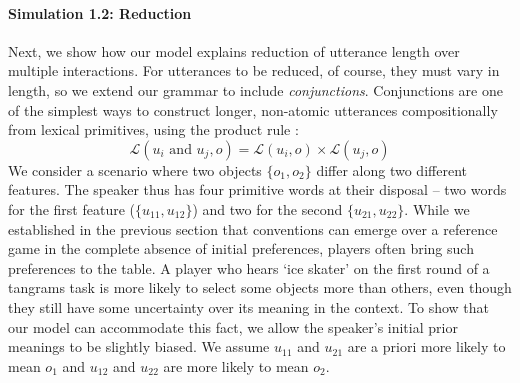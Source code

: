 \paragraph{Simulation 1.2: Reduction}

Next, we show how our model explains reduction of utterance length over multiple interactions. 
For utterances to be reduced, of course, they must vary in length, so we extend our grammar to include \emph{conjunctions}. 
Conjunctions are one of the simplest ways to construct longer, non-atomic utterances compositionally from lexical primitives, using the product rule \cite<see also>[who instead consider negation]{SteinertThrelkeld16_CompositionalSignaling}:
$$\mathcal{L}(u_i \textrm{ and } u_j, o) = \mathcal{L}(u_i, o) \times \mathcal{L}(u_j, o)$$
We consider a scenario where two objects $\{o_1, o_2\}$ differ along two different features. 
The speaker thus has four primitive words at their disposal -- two words for the first feature ($\{u_{11}, u_{12}\}$) and two for the second $\{u_{21}, u_{22}\}$. 
While we established in the previous section that conventions can emerge over a reference game in the complete absence of initial preferences, players often bring such preferences to the table. 
A player who hears `ice skater' on the first round of a tangrams task is more likely to select some objects more than others, even though they still have some uncertainty over its meaning in the context. 
To show that our model can accommodate this fact, we allow the speaker's initial prior meanings to be slightly biased. 
We assume $u_{11}$ and $u_{21}$ are a priori more likely to mean $o_1$ and $u_{12}$ and $u_{22}$ are more likely to mean $o_2$.

